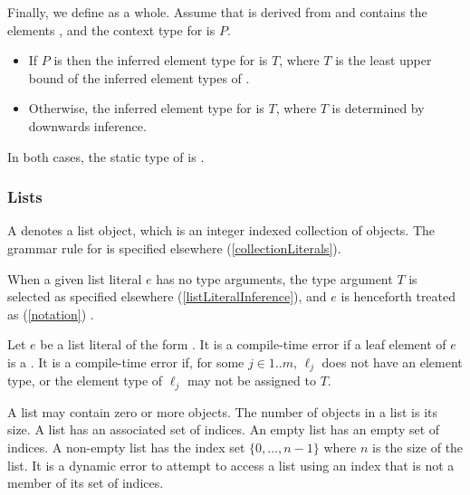 \documentclass[makeidx]{article}
\begin{document}
{
\vspace{3mm}
\EndCase

\LMHash{}%
Finally, we define
as a whole.
Assume that  is derived from 
and contains the elements ,
and the context type for  is $P$.

\begin{itemize}
\item
  If $P$ is \FreeContext{} then
  the inferred element type for  is $T$,
  where $T$ is the least upper bound of
  the inferred element types of .

\item
  Otherwise,
  the inferred element type for  is $T$,
  where $T$ is determined by downwards inference.
\end{itemize}

\LMHash{}%
In both cases, the static type of  is .


\subsubsection{Lists}

\LMHash{}%
A 
denotes a list object, which is an integer indexed collection of objects.
The grammar rule for  is specified elsewhere
(\ref{collectionLiterals}).

\LMHash{}%
When a given list literal $e$ has no type arguments,
the type argument $T$ is selected as specified elsewhere
(\ref{listLiteralInference}),
and $e$ is henceforth treated as
(\ref{notation})
.


\LMHash{}%
Let $e$ be a list literal of the form
.
It is a compile-time error if a leaf element of $e$ is a
.
It is a compile-time error if, for some $j \in 1 .. m$,
$\ell_j$ does not have an element type,
or the element type of $\ell_j$ may not be assigned to $T$.

\LMHash{}%
A list may contain zero or more objects.
The number of objects in a list is its size.
A list has an associated set of indices.
An empty list has an empty set of indices.
A non-empty list has the index set $\{0, \ldots, n - 1\}$
where $n$ is the size of the list.
It is a dynamic error to attempt to access a list
using an index that is not a member of its set of indices.

}
\end{document}
